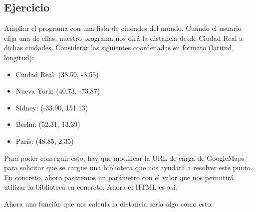 \documentclass[letterpaper,10pt,spanish]{sphinxmanual}
\begin{document}
\subsection{Ejercicio}
\label{\detokenize{tema4:id11}}
Ampliar el programa con una lista de ciudades del mundo. Cuando el usuario elija una de ellas, nuestro programa nos dirá la distancia desde Ciudad Real a dichas ciudades. Considerar las siguientes coordenadas en formato (latitud, longitud):
\begin{itemize}
\item {} 
Ciudad Real: (38.59, -3.55)

\item {} 
Nueva York: (40.73, -73.87)

\item {} 
Sidney: (-33.90, 151.13)

\item {} 
Berlin: (52.31, 13.39)

\item {} 
París: (48.85, 2.35)

\end{itemize}

Para poder conseguir esto, hay que modificar la URL de carga de GoogleMaps para solicitar que se cargue una biblioteca que nos ayudará a resolver este punto. En concreto, ahora pasaremos un parámetro  con el valor  que nos permitirá utilizar la biblioteca en concreto. Ahora el HTML es así:

\begin{sphinxVerbatim}[commandchars=\\\{\}]
     

\end{sphinxVerbatim}

Ahora una función que nos calcula la distancia sería algo como esto:
\end{document}
